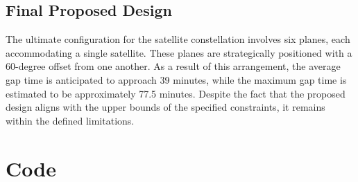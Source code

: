 \documentclass[a4paper, twoside]{article}
\begin{document}
\subsection{Final Proposed Design}
The ultimate configuration for the satellite constellation involves six planes, 
each accommodating a single satellite. These planes are strategically positioned 
with a 60-degree offset from one another. As a result of this arrangement, 
the average gap time is anticipated to approach 39 minutes, while the maximum gap 
time is estimated to be approximately 77.5 minutes. Despite the fact that the proposed 
design aligns with the upper bounds of the specified constraints, it remains within the 
defined limitations.

\section{Code}

\end{document}
